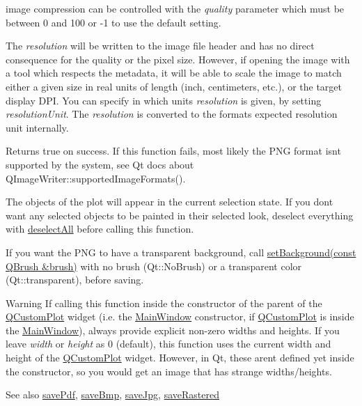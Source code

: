 image compression can be controlled with the {\itshape quality} parameter which must be between 0 and 100 or -\/1 to use the default setting.

The {\itshape resolution} will be written to the image file header and has no direct consequence for the quality or the pixel size. However, if opening the image with a tool which respects the metadata, it will be able to scale the image to match either a given size in real units of length (inch, centimeters, etc.), or the target display D\+PI. You can specify in which units {\itshape resolution} is given, by setting {\itshape resolution\+Unit}. The {\itshape resolution} is converted to the format\textquotesingle{}s expected resolution unit internally.

Returns true on success. If this function fails, most likely the P\+NG format isn\textquotesingle{}t supported by the system, see Qt docs about Q\+Image\+Writer\+::supported\+Image\+Formats().

The objects of the plot will appear in the current selection state. If you don\textquotesingle{}t want any selected objects to be painted in their selected look, deselect everything with \hyperlink{classQCustomPlot_a9d4808ab925b003054085246c92a257c}{deselect\+All} before calling this function.

If you want the P\+NG to have a transparent background, call \hyperlink{classQCustomPlot_a8ed256cf467bfa7ba1f9feaae62c3bd0}{set\+Background(const Q\+Brush \&brush)} with no brush (Qt\+::\+No\+Brush) or a transparent color (Qt\+::transparent), before saving.

\begin{DoxyWarning}{Warning}
If calling this function inside the constructor of the parent of the \hyperlink{classQCustomPlot}{Q\+Custom\+Plot} widget (i.\+e. the \hyperlink{classMainWindow}{Main\+Window} constructor, if \hyperlink{classQCustomPlot}{Q\+Custom\+Plot} is inside the \hyperlink{classMainWindow}{Main\+Window}), always provide explicit non-\/zero widths and heights. If you leave {\itshape width} or {\itshape height} as 0 (default), this function uses the current width and height of the \hyperlink{classQCustomPlot}{Q\+Custom\+Plot} widget. However, in Qt, these aren\textquotesingle{}t defined yet inside the constructor, so you would get an image that has strange widths/heights.
\end{DoxyWarning}
\begin{DoxySeeAlso}{See also}
\hyperlink{classQCustomPlot_ad5acd34f6b39c3516887d7e54fec2412}{save\+Pdf}, \hyperlink{classQCustomPlot_ae3a86ed0795670e50afa21759d4fa13d}{save\+Bmp}, \hyperlink{classQCustomPlot_a76f0d278e630a711fa6f48048cfd83e4}{save\+Jpg}, \hyperlink{classQCustomPlot_ad7723ce2edfa270632ef42b03a444352}{save\+Rastered} 
\end{DoxySeeAlso}
\mbox{\label{classQCustomPlot_ad7723ce2edfa270632ef42b03a444352}} 

